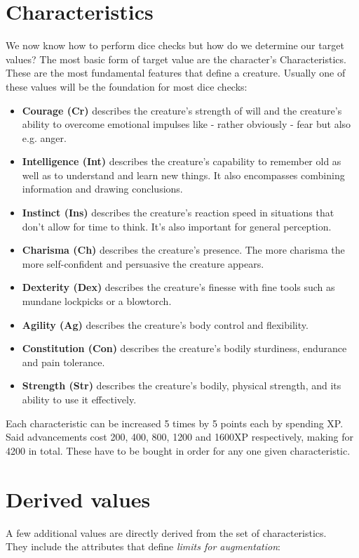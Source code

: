 \documentclass[12pt,a4paper,openany,dvipsnames]{book}
\begin{document}
	\section{Characteristics}
	We now know how to perform dice checks but how do we determine our target values?
	The most basic form of target value are the character’s Characteristics.
	These are the most fundamental features that define a creature.
	Usually one of these values will be the foundation for most dice checks:
	\begin{itemize}
		\setlength\itemsep{-8mm}
		\item \textbf{Courage (Cr)} describes the creature’s strength of will
			and the creature’s ability to overcome emotional impulses like
			- rather obviously - fear but also e.g. anger.
		\item \textbf{Intelligence (Int)} describes the creature’s capability to remember old as well as to understand and learn new things.
			It also encompasses combining information and drawing conclusions.
		\item \textbf{Instinct (Ins)} describes the creature’s reaction speed in situations that don’t allow for time to think.
			It's also important for general perception.
		\item \textbf{Charisma (Ch)} describes the creature’s presence. The more charisma the more self-confident and persuasive the creature appears.
		\item \textbf{Dexterity (Dex)} describes the creature’s finesse with fine tools such as mundane lockpicks or a blowtorch.
		\item \textbf{Agility (Ag)} describes the creature’s body control and flexibility.
		\item \textbf{Constitution (Con)} describes the creature’s bodily sturdiness, endurance and pain tolerance.
		\item \textbf{Strength (Str)} describes the creature’s bodily, physical strength,
			and its ability to use it effectively.
	\end{itemize}
	Each characteristic can be increased 5 times by 5 points each by spending XP. Said advancements cost 200, 400, 800, 1200 and 1600XP respectively, making for 4200 in total. These have to be bought in order for any one given characteristic.

	\section{Derived values}
	A few additional values are directly derived from the set of characteristics. \\
	They include the attributes that define \emph{limits for augmentation}:
\end{document}
